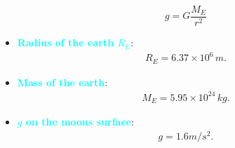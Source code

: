 \documentclass{report}
\begin{document}
\begin{itemize}
            \begin{equation}
                g = G \frac{M_E}{r^2}
            \end{equation}
        \item \textbf{\textcolor{cyan}{Radius of the earth $R_{E}$}}:
            \begin{align*}
                R_{E} = 6.37 \times 10^{6}\, m
            .\end{align*}
        \item \textbf{\textcolor{cyan}{Mass of the earth}}:
            \begin{align*}
                M_{E} = 5.95 \times 10^{24}\, kg
            .\end{align*}
        \item \textbf{\textcolor{cyan}{$g$ on the moons surface}}:
            \begin{align*}
                g = 1.6 m/s^{2}
            .\end{align*}
 

\end{itemize}
\end{document}

